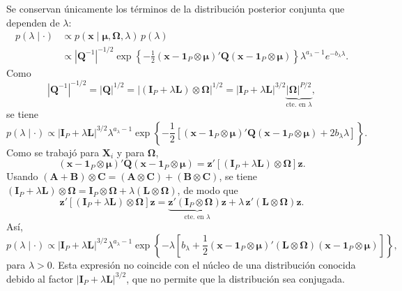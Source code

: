 \documentclass[11pt,a4paper]{article}
\begin{document}
Se conservan únicamente los términos de la distribución posterior conjunta que dependen de $\lambda$:
\begin{align*}
p(\lambda \mid \cdot)
&\propto p(\boldsymbol{x} \mid \boldsymbol{\mu}, \mathbf{\Omega}, \lambda)\, p(\lambda) \\[6pt]
&\propto |\mathbf{Q}^{-1}|^{-1/2} \exp\left\{ -\frac{1}{2} (\boldsymbol{x} - \boldsymbol{1}_P \otimes \boldsymbol{\mu})' \mathbf{Q} (\boldsymbol{x} - \boldsymbol{1}_P \otimes \boldsymbol{\mu}) \right\} \lambda^{a_\lambda - 1} e^{-b_\lambda \lambda}.
\end{align*}
Como
\[
|\mathbf{Q}^{-1}|^{-1/2} = |\mathbf{Q}|^{1/2} = |(\mathbf{I}_P + \lambda\mathbf{L}) \otimes \mathbf{\Omega}|^{1/2} = |\mathbf{I}_P + \lambda\mathbf{L}|^{3/2} \underbrace{|\mathbf{\Omega}|^{P/2}}_{\text{cte. en }\lambda},
\]
se tiene
\[
p(\lambda \mid \cdot) \propto |\mathbf{I}_P + \lambda\mathbf{L}|^{3/2} \lambda^{a_\lambda - 1} \exp\left\{ -\frac{1}{2}\left[ (\boldsymbol{x} - \boldsymbol{1}_P \otimes \boldsymbol{\mu})' \mathbf{Q} (\boldsymbol{x} - \boldsymbol{1}_P \otimes \boldsymbol{\mu}) + 2b_\lambda\lambda \right] \right\}.
\]
Como se trabajó para $\boldsymbol{X}_i$ y para $\mathbf{\Omega}$,
\[
(\boldsymbol{x} - \boldsymbol{1}_P \otimes \boldsymbol{\mu})' \mathbf{Q} (\boldsymbol{x} - \boldsymbol{1}_P \otimes \boldsymbol{\mu}) = \boldsymbol{z}'\left[(\mathbf{I}_P + \lambda\mathbf{L}) \otimes \mathbf{\Omega}\right]\boldsymbol{z}.
\]
Usando $(\mathbf{A} + \mathbf{B}) \otimes \mathbf{C} = (\mathbf{A} \otimes \mathbf{C}) + (\mathbf{B} \otimes \mathbf{C})$, se tiene $(\mathbf{I}_P + \lambda\mathbf{L}) \otimes \mathbf{\Omega} = \mathbf{I}_P \otimes \mathbf{\Omega} + \lambda(\mathbf{L} \otimes \mathbf{\Omega})$, de modo que
\[
\boldsymbol{z}'\left[(\mathbf{I}_P + \lambda\mathbf{L}) \otimes \mathbf{\Omega}\right]\boldsymbol{z}
= \underbrace{\boldsymbol{z}'(\mathbf{I}_P \otimes \mathbf{\Omega})\boldsymbol{z}}_{\text{cte. en }\lambda} + \lambda\,\boldsymbol{z}'(\mathbf{L} \otimes \mathbf{\Omega})\boldsymbol{z}.
\]
Así,
\[
p(\lambda \mid \cdot) \propto |\mathbf{I}_P + \lambda\mathbf{L}|^{3/2} \lambda^{a_\lambda - 1} \exp\left\{ -\lambda\left[ b_\lambda + \frac{1}{2}(\boldsymbol{x} - \boldsymbol{1}_P \otimes \boldsymbol{\mu})'(\mathbf{L} \otimes \mathbf{\Omega})(\boldsymbol{x} - \boldsymbol{1}_P \otimes \boldsymbol{\mu}) \right] \right\},
\]
para $\lambda > 0$. Esta expresión no coincide con el núcleo de una distribución conocida debido al factor $|\mathbf{I}_P + \lambda\mathbf{L}|^{3/2}$, que no permite que la distribución sea conjugada.
\end{document}

